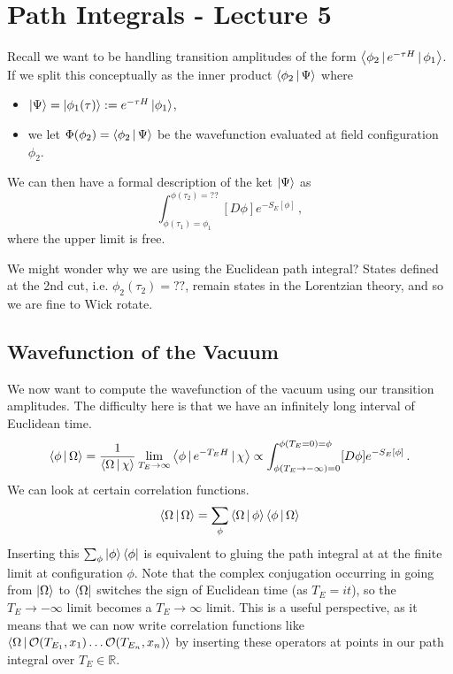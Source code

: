 \documentclass{article}
\begin{document}
\section{Path Integrals - Lecture 5}
Recall we want to be handling transition amplitudes of the form $\left\langle \phi_2 \, | \, e^{-\tau H} \, | \, \phi_1 \right\rangle$. If we split this conceptually as the inner product $\left\langle \phi_2 \, | \, \Psi \right\rangle$ where
\begin{itemize}
	\item $\ket{\Psi} = \ket{\phi_1(\tau)} := e^{-\tau H} \ket{\phi_1}$,
\item we let $\Phi(\phi_2) = \left\langle \phi_2 \, | \, \Psi \right\rangle$ be the wavefunction evaluated at field configuration $\phi_2$. 
\end{itemize}
We can then have a formal description of the ket $\ket{\Psi}$ as 
\[
\int_{\phi(\tau_1) = \phi_1}^{\phi(\tau_2) = ??} [D\phi] e^{-S_E[\phi]} \, , 
\]
where the upper limit is free. 
\begin{remark}
	We might wonder why we are using the Euclidean path integral? States defined at the 2nd cut, i.e. $\phi_2(\tau_2)=??$, remain states in the Lorentzian theory, and so we are fine to Wick rotate. 
\end{remark}

\subsection{Wavefunction of the Vacuum}
We now want to compute the wavefunction of the vacuum using our transition amplitudes. The difficulty here is that we have an infinitely long interval of Euclidean time. 
\begin{align*}
	\left\langle \phi \, | \, \Omega \right\rangle = \frac{1}{\left\langle \Omega \, | \, \chi \right\rangle} \lim_{T_E \to \infty} \left\langle \phi \, | \, e^{-T_E H} \, | \, \chi \right\rangle \propto \int_{\phi(T_E \to -\infty)=0}^{\phi(T_E = 0) = \phi} [D\phi] e^{-S_E[\phi]} \, . 
\end{align*}
We can look at certain correlation functions. 
\[
\left\langle \Omega \, | \, \Omega \right\rangle = \sum_\phi \left\langle \Omega \, | \, \phi \right\rangle \left\langle \phi \, | \, \Omega \right\rangle 
\]
Inserting this $\sum_\phi \ket{\phi} \bra{\phi}$ is equivalent to gluing the path integral at at the finite limit at configuration $\phi$. Note that the complex conjugation occurring in going from $\ket{\Omega}$ to $\bra{\Omega}$ switches the sign of Euclidean time (as $T_E =it$), so the $T_E \to -\infty$ limit becomes a $T_E \to \infty$ limit. This is a useful perspective, as it means that we can now write correlation functions like $\left\langle  \Omega \, | \, \mathcal{O}(T_{E_1}, x_1) \dots \mathcal{O}(T_{E_n}, x_n) \right\rangle$ by inserting these operators at points in our path integral over $T_E \in \mathbb{R}$. 
\end{document}

